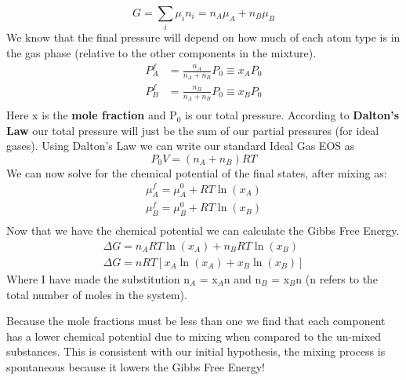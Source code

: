 \documentclass{article}
\begin{document}
\begin{equation}
    G = \sum_i \mu_i n_i = n_A\mu_A + n_B \mu_B
\end{equation}
We know that the final pressure will depend on how much of each atom type is in the gas phase (relative to the other components in the mixture).
\begin{equation}
    \begin{split}
        P_A^f &= \frac{n_A}{n_A+n_B}P_0 \equiv x_AP_0\\
        P_B^f &= \frac{n_B}{n_A+n_B}P_0 \equiv x_BP_0\\
    \end{split}
\end{equation}
Here x is the \textbf{mole fraction} and P$_0$ is our total pressure.
According to \textbf{Dalton's Law} our total pressure will just be the sum of our partial pressures (for ideal gases).
Using Dalton's Law we can write our standard Ideal Gas EOS as
\begin{equation}
    P_0V = (n_A+n_B)RT
\end{equation}
We can now solve for the chemical potential of the final states, after mixing as:
\begin{equation}
    \begin{split}
        \mu_A^f = \mu_A^0 + RT\ln(x_A)\\
        \mu_B^f = \mu_B^0 + RT\ln(x_B)\\
    \end{split}
\end{equation}
Now that we have the chemical potential we can calculate the Gibbs Free Energy.
\begin{equation}
    \begin{split}
        \Delta G = n_ART\ln(x_A) + n_BRT\ln(x_B) \\
        \Delta G = nRT\left[x_A\ln(x_A) + x_B\ln(x_B)\right]
    \end{split}
\end{equation}
Where I have made the substitution n$_A$ = x$_A$n and n$_B$ = x$_B$n (n refers to the total number of moles in the system). 

Because the mole fractions must be less than one we find that each component has a lower chemical potential due to mixing when compared to the un-mixed substances. 
This is consistent with our initial hypothesis, the mixing process is spontaneous because it lowers the Gibbs Free Energy!
\end{document}
